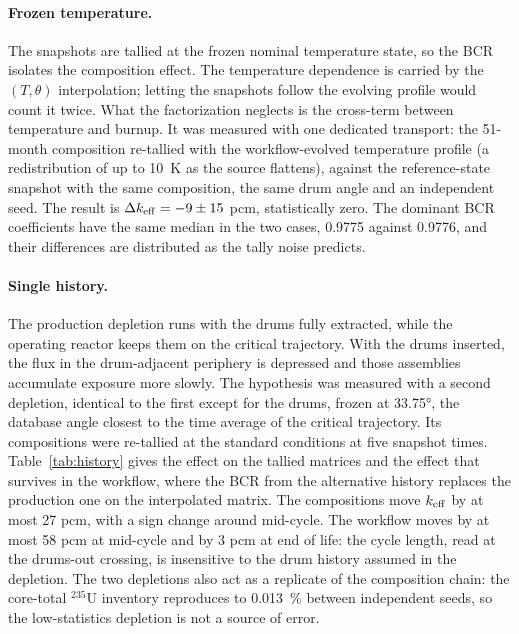 \documentclass[]{ANStopical}
\begin{document}
\paragraph{Frozen temperature.} The snapshots are tallied at the frozen nominal temperature state, so the BCR isolates the composition effect. The temperature dependence is carried by the $(T,\theta)$ interpolation; letting the snapshots follow the evolving profile would count it twice. What the factorization neglects is the cross-term between temperature and burnup. It was measured with one dedicated transport: the 51-month composition re-tallied with the workflow-evolved temperature profile (a redistribution of up to \SI{+10}{K} as the source flattens), against the reference-state snapshot with the same composition, the same drum angle and an independent seed. The result is $\Delta k_{\rm eff} = -9 \pm 15$ pcm, statistically zero. The dominant BCR coefficients have the same median in the two cases, 0.9775 against 0.9776, and their differences are distributed as the tally noise predicts.

\paragraph{Single history.} The production depletion runs with the drums fully extracted, while the operating reactor keeps them on the critical trajectory. With the drums inserted, the flux in the drum-adjacent periphery is depressed and those assemblies accumulate exposure more slowly. The hypothesis was measured with a second depletion, identical to the first except for the drums, frozen at \ang{33.75}, the database angle closest to the time average of the critical trajectory. Its compositions were re-tallied at the standard conditions at five snapshot times. Table~\ref{tab:history} gives the effect on the tallied matrices and the effect that survives in the workflow, where the BCR from the alternative history replaces the production one on the interpolated matrix. The compositions move $k_{\rm eff}$ by at most 27 pcm, with a sign change around mid-cycle. The workflow moves by at most 58 pcm at mid-cycle and by 3 pcm at end of life: the cycle length, read at the drums-out crossing, is insensitive to the drum history assumed in the depletion. The two depletions also act as a replicate of the composition chain: the core-total $^{235}$U inventory reproduces to \SI{0.013}{\percent} between independent seeds, so the low-statistics depletion is not a source of error.
\end{document}
